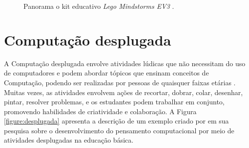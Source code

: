 \begin{figure}[h!]
    \centering
    \setlength{\fboxrule}{0.1pt} %
    \caption{Panorama o kit educativo \textit{Lego Mindstorms EV3} \citep{legomindstorms2024}.}
    \label{figure:legomindstorms}
\end{figure}

\section{Computação desplugada}

A Computação desplugada envolve atividades lúdicas que não necessitam do uso de computadores e podem abordar tópicos que ensinam conceitos de Computação, podendo ser realizadas por pessoas de quaisquer faixas etárias \citep{brackmann2017desenvolvimento}. Muitas vezes, as atividades envolvem ações de recortar, dobrar, colar, desenhar, pintar, resolver problemas, e os estudantes podem trabalhar em conjunto, promovendo habilidades de criatividade e colaboração. A Figura \ref{figure:desplugada} apresenta a descrição de um exemplo criado por \citet{brackmann2017desenvolvimento} em sua pesquisa sobre o desenvolvimento do pensamento computacional por meio de atividades desplugadas na educação básica.

